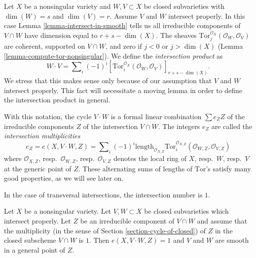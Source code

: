 \noindent
Let $X$ be a nonsingular variety and $W, V \subset X$
be closed subvarieties with $\dim(W) = s$ and $\dim(V) = r$.
Assume $V$ and $W$ intersect properly.
In this case Lemma \ref{lemma-intersect-in-smooth} tells us all irreducible
components of $V \cap W$ have dimension equal to $r + s - \dim(X)$.
The sheaves $\text{Tor}_j^{\mathcal{O}_X}(\mathcal{O}_W, \mathcal{O}_V)$ are
coherent, supported on $V \cap W$, and zero if $j < 0$ or $j > \dim(X)$
(Lemma \ref{lemma-compute-tor-nonsingular}).
We define the {\it intersection product} as
$$
W \cdot V = \sum\nolimits_i (-1)^i
[\text{Tor}_i^{\mathcal{O}_X}(\mathcal{O}_W, \mathcal{O}_V)]_{r + s - \dim(X)}.
$$
We stress that this makes sense only because of our assumption that
$V$ and $W$ intersect properly. This fact will necessitate a moving
lemma in order to define the intersection product in general.

\medskip\noindent
With this notation, the cycle $V \cdot W$ is a formal linear
combination $\sum e_Z Z$ of the irreducible components $Z$
of the intersection $V \cap W$. The integers $e_Z$ are called
the {\it intersection multiplicities}
$$
e_Z = e(X, V \cdot W, Z) =
\sum\nolimits_i
(-1)^i
\text{length}_{\mathcal{O}_{X, Z}}
\text{Tor}_i^{\mathcal{O}_{X, Z}}(\mathcal{O}_{W, Z}, \mathcal{O}_{V, Z})
$$
where $\mathcal{O}_{X, Z}$, resp.\ $\mathcal{O}_{W, Z}$,
resp.\ $\mathcal{O}_{V, Z}$ denotes the local ring of $X$, resp.\ $W$,
resp.\ $V$ at the generic point of $Z$.
These alternating sums of lengths of $\text{Tor}$'s satisfy many good
properties, as we will see later on.

\medskip\noindent
In the case of transversal intersections, the intersection number is $1$.

\begin{lemma}
\label{lemma-transversal}
Let $X$ be a nonsingular variety. Let $V, W \subset X$ be
closed subvarieties which intersect properly. Let $Z$ be an irreducible
component of $V \cap W$ and assume that the multiplicity
(in the sense of Section \ref{section-cycle-of-closed}) of $Z$
in the closed subscheme $V \cap W$ is $1$.
Then $e(X, V \cdot W, Z) = 1$ and $V$ and $W$ are smooth
in a general point of $Z$.
\end{lemma}


